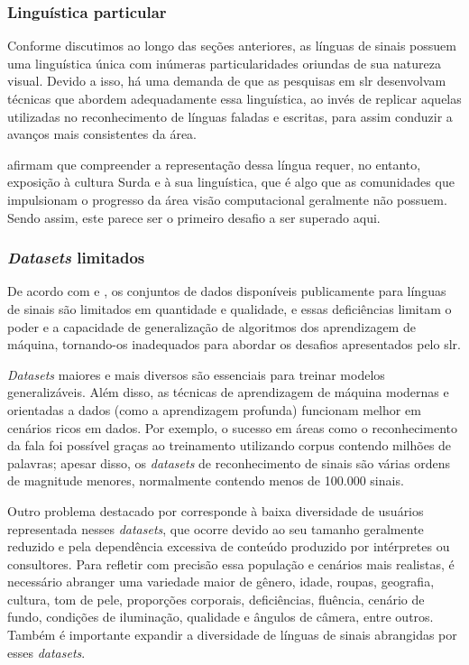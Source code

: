 \subsubsection{Linguística particular}
\label{sec:slr-desafios-linguistica-particular}

Conforme discutimos ao longo das seções anteriores, as línguas de sinais possuem uma linguística única com inúmeras particularidades oriundas de sua natureza visual. Devido a isso, há uma demanda de que as pesquisas em \acrshort{slr} desenvolvam técnicas que abordem adequadamente essa linguística, ao invés de replicar aquelas utilizadas no reconhecimento de línguas faladas e escritas, para assim conduzir a avanços mais consistentes da área.

 afirmam que compreender a representação dessa língua requer, no entanto, exposição à cultura Surda e à sua linguística, que é algo que as comunidades que impulsionam o progresso da área visão computacional geralmente não possuem. Sendo assim, este parece ser o primeiro desafio a ser superado aqui.



\subsubsection{\textit{Datasets} limitados}
\label{sec:slr-desafios-datasets-limitados}

De acordo com  e , os conjuntos de dados disponíveis publicamente para línguas de sinais são limitados em quantidade e qualidade, e essas deficiências limitam o poder e a capacidade de generalização de algoritmos dos aprendizagem de máquina, tornando-os inadequados para abordar os desafios apresentados pelo \acrshort{slr}. 

\textit{Datasets} maiores e mais diversos são essenciais para treinar modelos generalizáveis. Além disso, as técnicas de aprendizagem de máquina modernas e orientadas a dados (como a aprendizagem profunda) funcionam melhor em cenários ricos em dados. Por exemplo, o sucesso em áreas como o reconhecimento da fala foi possível graças ao treinamento utilizando corpus contendo milhões de palavras; apesar disso, os \textit{datasets} de reconhecimento de sinais são várias ordens de magnitude menores, normalmente contendo menos de 100.000 sinais.

Outro problema destacado por  corresponde à baixa diversidade de usuários representada nesses \textit{datasets}, que ocorre devido ao seu tamanho geralmente reduzido e pela dependência excessiva de conteúdo produzido por intérpretes ou consultores. Para refletir com precisão essa população e cenários mais realistas, é necessário abranger uma variedade maior de gênero, idade, roupas, geografia, cultura, tom de pele, proporções corporais, deficiências, fluência, cenário de fundo, condições de iluminação, qualidade e ângulos de câmera, entre outros. Também é importante expandir a diversidade de línguas de sinais abrangidas por esses \textit{datasets}.

